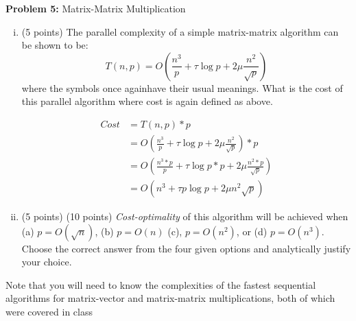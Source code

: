 \documentclass{article}
\begin{document}
    \textbf{Problem 5:} Matrix-Matrix Multiplication
    \begin{enumerate}[i.]
    \item (5 points) The parallel complexity of a simple matrix-matrix algorithm can be shown to be:
    \begin{equation}
        T(n,p) = O(\frac{n^3}{p} + \tau\log{p}+2\mu\frac{n^2}{\sqrt{p}})
    \end{equation}
    where the symbols once againhave their usual meanings. What is the cost of this parallel algorithm
where cost is again defined as above.

    \begin{align*}
        Cost &= T(n,p) * p\\
        &= O(\frac{n^3}{p} + \tau\log{p}+2\mu\frac{n^2}{\sqrt{p}})*p\\
        &= O(\frac{n^3*p}{p} + \tau\log{p}*p+2\mu\frac{n^2*p}{\sqrt{p}})\\
        &= O(n^3 + \tau{p}\log{p} + 2\mu{n^2}\sqrt{p})
    \end{align*}

    \item (5 points) (10 points) \textit{Cost-optimality} of this algorithm will be achieved when (a) $p = O(\sqrt{n})$, (b) $p = O(n)$ (c),
    $p = O(n^2)$, or (d) $p = O(n^3)$. Choose the correct answer from the four given options and analytically
    justify your choice.
    \end{enumerate}

Note that you will need to know the complexities of the fastest sequential algorithms for matrix-vector and
matrix-matrix multiplications, both of which were covered in class

    
\end{document}
